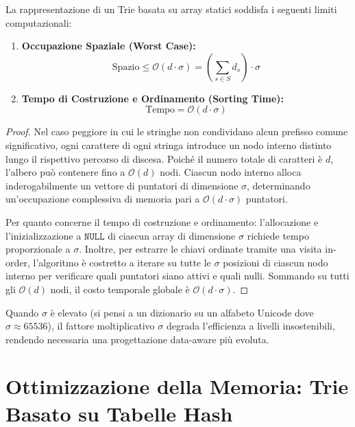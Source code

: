 \begin{theorem}
\label{thm:complessita-array-based-trie}
La rappresentazione di un Trie basata su array statici soddisfa i seguenti limiti computazionali:
\begin{enumerate}
  \item \textbf{Occupazione Spaziale (Worst Case):}
  \begin{equation}
    \text{Spazio} \le \mathcal{O}(d \cdot \sigma) = \left( \sum_{s \in S} d_s \right) \cdot \sigma
  \end{equation}
  \item \textbf{Tempo di Costruzione e Ordinamento (Sorting Time):}
  \begin{equation}
    \text{Tempo} = \mathcal{O}(d \cdot \sigma)
  \end{equation}
\end{enumerate}
\end{theorem}

\begin{proof}
Nel caso peggiore in cui le stringhe non condividano alcun prefisso comune significativo, ogni carattere di ogni stringa introduce un nodo interno distinto lungo il rispettivo percorso di discesa. Poich\'e il numero totale di caratteri \`e $d$, l'albero pu\`o contenere fino a $\mathcal{O}(d)$ nodi. Ciascun nodo interno alloca inderogabilmente un vettore di puntatori di dimensione $\sigma$, determinando un'occupazione complessiva di memoria pari a $\mathcal{O}(d \cdot \sigma)$ puntatori.

Per quanto concerne il tempo di costruzione e ordinamento: l'allocazione e l'inizializzazione a $\texttt{NULL}$ di ciascun array di dimensione $\sigma$ richiede tempo proporzionale a $\sigma$. Inoltre, per estrarre le chiavi ordinate tramite una visita in-order, l'algoritmo \`e costretto a iterare su tutte le $\sigma$ posizioni di ciascun nodo interno per verificare quali puntatori siano attivi e quali nulli. Sommando su tutti gli $\mathcal{O}(d)$ nodi, il costo temporale globale \`e $\mathcal{O}(d \cdot \sigma)$.
\end{proof}

Quando $\sigma$ \`e elevato (si pensi a un dizionario su un alfabeto Unicode dove $\sigma \approx 65536$), il fattore moltiplicativo $\sigma$ degrada l'efficienza a livelli insostenibili, rendendo necessaria una progettazione data-aware pi\`u evoluta.

\FloatBarrier
\section{Ottimizzazione della Memoria: Trie Basato su Tabelle Hash}
\label{sec:hash-based-trie}

